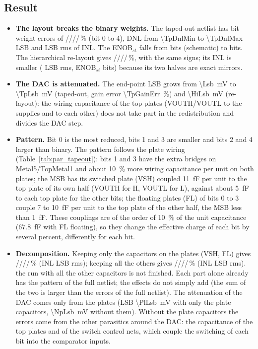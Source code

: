 \subsection{Result}
\begin{itemize}
  \item \textbf{The layout breaks the binary weights.} The taped-out netlist has bit weight errors of
        \TpBitEA{}/\TpBitEB{}/\TpBitEC{}/\TpBitED{}/\TpBitEE{}\,\% (bit 0 to 4), DNL from
        \num{\TpDnlMin} to \num{\TpDnlMax} LSB and \TpInlRms{} LSB rms of INL. The ENOB$_{st}$ falls from
        \SchStEnob{} bits (schematic) to \TpStEnob{} bits. The hierarchical re-layout gives
        \HiBitEA{}/\HiBitEB{}/\HiBitEC{}/\HiBitED{}/\HiBitEE{}\,\%, with the same signs; its INL is smaller
        (\HiInlRms{} LSB rms, ENOB$_{st}$ \HiStEnob{} bits) because its two halves are exact mirrors.
  \item \textbf{The DAC is attenuated.} The end-point LSB grows from \SI{\Lsb}{mV} to \SI{\TpLsb}{mV}
        (taped-out, gain error \SI{\TpGainErr}{\percent}) and \SI{\HiLsb}{mV} (re-layout): the wiring
        capacitance of the top plates (VOUTH/VOUTL to the supplies and to each other) does not take part in
        the redistribution and divides the DAC step.
  \item \textbf{Pattern.} Bit 0 is the most reduced, bits 1 and 3 are smaller and bits 2 and 4 larger
        than binary. The pattern follows the plate wiring (Table~\ref{tab:par_tapeout}): bits 1 and 3 have
        the extra bridges on Metal5/TopMetal1 and about \SI{10}{\percent} more wiring capacitance per unit
        on both plates; the MSB has its switched plate (VSH) coupled \SI{11}{fF} per unit to the top plate
        of its own half (VOUTH for H, VOUTL for L), against about \SI{5}{fF} to each top plate for the other bits; the floating plates
        (FL) of bits 0 to 3 couple 7 to \SI{10}{fF} per unit to the top plate of the other half, the MSB
        less than \SI{1}{fF}. These couplings are of the order of \SI{10}{\percent} of the unit
        capacitance (\SI{67.8}{fF} with FL floating), so they change the effective charge of each bit by
        several percent, differently for each bit.
  \item \textbf{Decomposition.} Keeping only the capacitors on the plates (VSH, FL) gives
        \PlBitEA{}/\PlBitEB{}/\PlBitEC{}/\PlBitED{}/\PlBitEE{}\,\% (INL \PlInlRms{} LSB rms);
        \ifdefined\NpBitEA
        keeping all the others gives \NpBitEA{}/\NpBitEB{}/\NpBitEC{}/\NpBitED{}/\NpBitEE{}\,\%
        (INL \NpInlRms{} LSB rms).
        \else
        the run with all the other capacitors is not finished.
        \fi
        Each part alone already has the pattern of the full netlist; the effects do not simply add
        (the sum of the two is larger than the errors of the full netlist). The attenuation of the DAC comes only from the
        plates (LSB \SI{\PlLsb}{mV} with only the plate capacitors, \SI{\NpLsb}{mV} without them).
        Without the plate capacitors the errors come from the other parasitics around the DAC: the
        capacitance of the top plates and of the switch control nets, which couple the switching of
        each bit into the comparator inputs.
\end{itemize}

